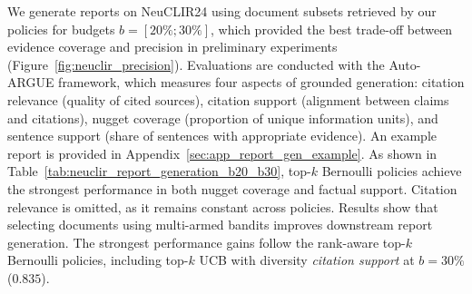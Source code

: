 
We generate reports on NeuCLIR24 using document subsets retrieved by our policies for budgets \(b=[20\%;30\%]\), which provided the best trade-off between evidence coverage and precision in preliminary experiments (Figure~\ref{fig:neuclir_precision}). Evaluations are conducted with the Auto-ARGUE framework, which measures four aspects of grounded generation: citation relevance (quality of cited sources), citation support (alignment between claims and citations), nugget coverage (proportion of unique information units), and sentence support (share of sentences with appropriate evidence).
An example report is provided in Appendix~\ref{sec:app_report_gen_example}.
As shown in Table~\ref{tab:neuclir_report_generation_b20_b30}, top-$k$ Bernoulli policies achieve the strongest performance in both nugget coverage and factual support. Citation relevance is omitted, as it remains constant across policies. Results show that selecting documents using multi-armed bandits improves downstream report generation. The strongest performance gains follow the rank-aware top-$k$ Bernoulli policies, including top-$k$ UCB with diversity \emph{citation support} at $b{=}30\%$ ($0.835$). 


